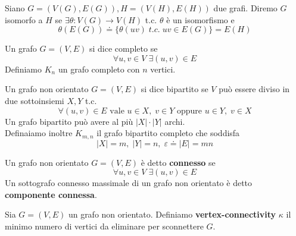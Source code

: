 \begin{definizione}
    Siano \(G=(V(G),E(G)), H=(V(H),E(H))\) due grafi. Diremo \(G\) isomorfo a \(H\) se \(\exists \theta : V(G) \to V(H)\) t.c. \(\theta\) è un isomorfismo e
    \begin{equation}
        \theta(E(G)) \doteq \{ \theta(uv) \; t.c.\; uv \in E(G)\} = E(H)
    \end{equation}
\end{definizione}

\begin{definizione}
    Un grafo \(G=(V,E)\) si dice completo se
    \begin{equation}
        \forall u,v \in V \; \exists (u,v) \in E
    \end{equation}
    Definiamo \(K_n\) un grafo completo con \(n\) vertici.
\end{definizione}

\begin{definizione}
    Un grafo non orientato \(G=(V,E)\) si dice bipartito se \(V\) può essere diviso in due sottoinsiemi \(X,Y\) t.c.
    \begin{equation}
        \forall (u,v) \in E \text{ vale } u\in X,\; v\in Y \text{ oppure } u\in Y,\; v\in X
    \end{equation}
    Un grafo bipartito può avere al più \(|X|\cdot |Y|\) archi. \\
    Definaiamo inoltre \(K_{m,n}\) il grafo bipartito completo che soddisfa
    \begin{equation}
        |X|=m,\; |Y|=n,\; \varepsilon \doteq |E| = mn
    \end{equation}
\end{definizione}

\begin{definizione}[Connessione]
    Un grafo non orientato \(G=(V,E)\) è detto \textbf{connesso} se
    \begin{equation}
        \forall u,v \in V \; \exists (u,v) \in E
    \end{equation}
    Un sottografo connesso massimale di un grafo non orientato è detto \textbf{componente connessa}.
\end{definizione}

\begin{definizione}
    Sia \(G=(V,E)\) un grafo non orientato. Definiamo \textbf{vertex-connectivity}  \(\kappa\) il minimo numero di vertici da eliminare per sconnettere \(G\).
\end{definizione}

